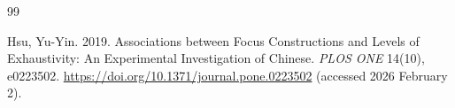 \documentclass[a4paper, ruler]{CUP-JNL-LIN}%
\begin{document}
\begin{Backmatter}
\begin{thebibliography}{99}

{Hsu, Yu-Yin}. 2019. Associations between Focus Constructions and Levels of Exhaustivity: An Experimental Investigation of Chinese. \textit{PLOS ONE} 14(10), e0223502. \url{https://doi.org/10.1371/journal.pone.0223502}  (accessed 2026 February 2).




\end{thebibliography}
\end{Backmatter}
\end{document}
